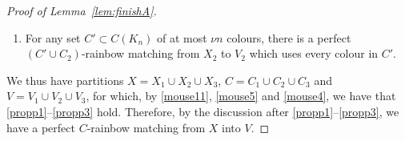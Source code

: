 \begin{proof}[Proof of Lemma~\ref{lem:finishA}]
\begin{enumerate}[label = {\bfseries \Alph{propcounter}\arabic{enumi}}]\addtocounter{enumi}{5}
\item For any set $C'\subset C(K_n)$ of at most $\nu n$ colours, there is a perfect $(C'\cup C_2)$-rainbow matching from $X_2$ to $V_2$ which uses every colour in $C'$.\label{mouse5}
\end{enumerate}

We thus have partitions $X=X_1\cup X_2\cup X_3$, $C=C_1\cup C_2\cup C_3$ and $V=V_1\cup V_2\cup V_3$, for which, by \ref{mouse11}, \ref{mouse5} and \ref{mouse4}, we have that
\ref{propp1}--\ref{propp3} hold. Therefore, by the discussion after \ref{propp1}--\ref{propp3}, we have a perfect $C$-rainbow matching from $X$ into $V$.
\end{proof}
